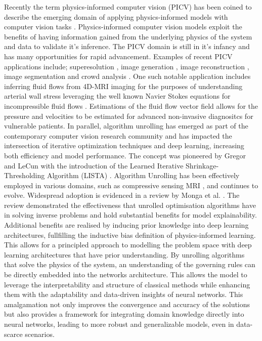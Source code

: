 \IEEEPARstart{}{} Recently the term physics-informed computer vision (PICV) has been coined to describe the emerging domain of applying physics-informed models with computer vision tasks \cite{banerjee2023physics,kadambi2023incorporating}. Physics-informed computer vision models exploit the benefits of having information gained from the underlying physics of the system and data to validate it's inference. The PICV domain is still in it's infancy and has many opportunities for rapid advancement. Examples of recent PICV applications include; superesolution \cite{arora2022spatio}, image generation \cite{zheng2020physics}, image reconstruction \cite{chu2022physics}, image segmentation \cite{jenkins2020physics, cciccek20163d} and crowd analysis \cite{behera2021pidlnet}. One such notable application includes inferring fluid flows from 4D-MRI imaging for the purposes of understanding arterial wall stress leveraging the well known Navier Stokes equations for incompressible fluid flows \cite{raissi2020hidden}. Estimations of the fluid flow vector field allows for the pressure and velocities to be estimated for advanced non-invasive diagnositcs for vulnerable patients. 
\IEEEPARstart{}{} In parallel, algorithm unrolling has emerged as part of the contemporary computer vision research community and has impacted the intersection of iterative optimization techniques and deep learning, increasing both efficiency and model performance. The concept was pioneered by Gregor and LeCun with the introduction of the Learned Iterative Shrinkage-Thresholding Algorithm (LISTA) \cite{gregor2010learning}. Algorithm Unrolling has been effectively employed in various domains, such as compressive sensing MRI \cite{yang2016deep}, and continues to evolve. Widespread adoption is evidenced in a review by Monga et al. \cite{monga2021algorithm}. The review demonstrated the effectiveness that unrolled optimisation algorithms have in solving inverse problems and hold substantial benefits for model explainability. Additional benefits are realised by inducing prior knowledge into deep learning architectures, fullfilling the inductive bias definition of physics-informed learning. This allows for a principled approach to modelling the problem space with deep learning architectures that have prior understanding. 
\IEEEPARstart{}{} By unrolling algorithms that solve the physics of the system, an understanding of the governing rules can be directly embedded into the networks architecture. This allows the model to leverage the interpretability and structure of classical methods while enhancing them with the adaptability and data-driven insights of neural networks. This amalgamation not only improves the convergence and accuracy of the solutions but also provides a framework for integrating domain knowledge directly into neural networks, leading to more robust and generalizable models, even in data-scarce scenarios. 
